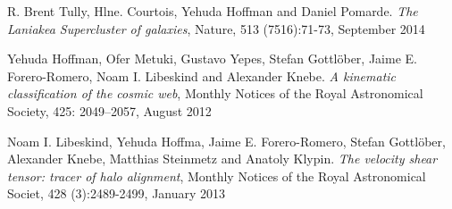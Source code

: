 \documentclass[preprint,proceedings]{rmaa}
\begin{document}
\begin{thebibliography}

 R. Brent Tully, Hlne. Courtois, Yehuda Hoffman and Daniel Pomarde. 
{\em The Laniakea Supercluster of galaxies}, Nature, 513 (7516):71-73, September 2014 
 
 Yehuda Hoffman, Ofer Metuki, Gustavo Yepes, Stefan Gottlöber, Jaime E. Forero-Romero, Noam I. Libeskind and Alexander Knebe. 
{\em A kinematic classification of the cosmic web}, Monthly Notices of the Royal Astronomical Society, 425: 2049–2057, August 2012

 Noam I. Libeskind, Yehuda Hoffma, Jaime E. Forero-Romero, Stefan Gottlöber, Alexander Knebe, Matthias Steinmetz and Anatoly Klypin. 
{\em The velocity shear tensor: tracer of halo alignment}, Monthly Notices of the Royal Astronomical Societ, 428 (3):2489-2499, January 2013
  
\end{thebibliography}
\end{document}
